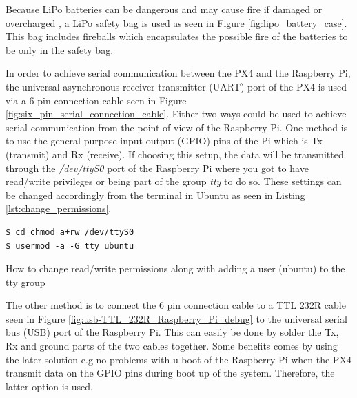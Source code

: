 \documentclass[../Head/report.tex]{subfiles}
\begin{document}
Because LiPo batteries can be dangerous and may cause fire if damaged or overcharged \cite{lipoBatteryGuide}, a LiPo safety bag is used as seen in Figure \ref{fig:lipo_battery_case}. This bag includes fireballs which encapsulates the possible fire of the batteries to be only in the safety bag. 

In order to achieve serial communication between the PX4 and the Raspberry Pi, the universal asynchronous receiver-transmitter (UART) port of the PX4 is used via a 6 pin connection cable seen in Figure \ref{fig:six_pin_serial_connection_cable}. Either two ways could be used to achieve serial communication from the point of view of the Raspberry Pi. One method is to use the general purpose input output (GPIO) pins of the Pi which is Tx (transmit) and Rx (receive). If choosing this setup, the data will be transmitted through the \textit{/dev/ttyS0} port of the Raspberry Pi where you got to have read/write privileges or being part of the group \textit{tty} to do so. These settings can be changed accordingly from the terminal in Ubuntu as seen in Listing \ref{lst:change_permissions}. 

\begin{listing}[H] 
\begin{tcolorbox}[
    enhanced,
    attach boxed title to top left={xshift=6mm,yshift=-3mm},
    colback=lightgreen!20,
    colframe=lightgreen,
    fonttitle=\bfseries\color{black},
]
\begin{verbatim}
$ cd chmod a+rw /dev/ttyS0
$ usermod -a -G tty ubuntu
\end{verbatim}
\end{tcolorbox}
\caption{How to change read/write permissions along with adding a user (ubuntu) to the tty group}
\label{lst:change_permissions}    
\end{listing} 

The other method is to connect the 6 pin connection cable to a TTL 232R cable seen in Figure \ref{fig:usb-TTL_232R_Raspberry_Pi_debug} to the universal serial bus (USB) port of the Raspberry Pi. This can easily be done by solder the Tx, Rx and ground parts of the two cables together. Some benefits comes by using the later solution e.g no problems with u-boot of the Raspberry Pi when the PX4 transmit data on the GPIO pins during boot up of the system. Therefore, the latter option is used.
\end{document}

